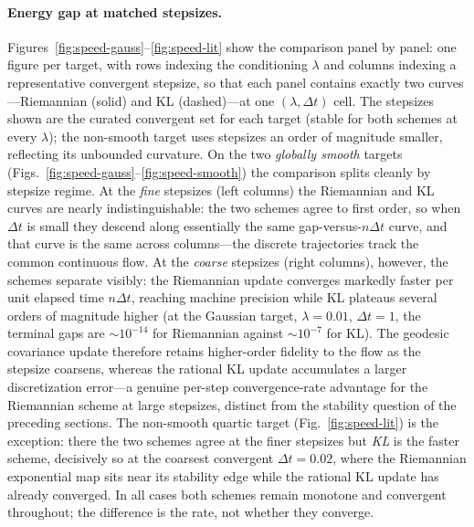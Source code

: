 \documentclass[11pt]{article}
\begin{document}
\begin{table}[t]
\centering
\caption{Head-to-head convergence speed at matched stepsize: terminal energy gap
$\mathcal{E}(a_N)-\mathcal{E}(a_\star)$ (geometric mean over $\lambda\in\{0.01,0.1,1\}$)
for each scheme, the faster scheme, and the factor by which its terminal gap is
smaller. Riemannian wins on both smooth targets, with the margin growing as
$\Delta t$ coarsens; KL wins only on the non-smooth quartic, and only modestly.}
\label{tab:disc-conv}
\end{table}

\paragraph{Energy gap at matched stepsizes.}
Figures~\ref{fig:speed-gauss}--\ref{fig:speed-lit} show the comparison
panel by panel: one figure per target, with rows indexing the conditioning
$\lambda$ and columns indexing a representative convergent stepsize, so that
each panel contains exactly two curves---Riemannian (solid) and KL
(dashed)---at one $(\lambda,\Delta t)$ cell. The stepsizes shown are the curated
convergent set for each target (stable for both schemes at every $\lambda$);
the non-smooth target uses stepsizes an order of magnitude smaller, reflecting its
unbounded curvature. On the two \emph{globally smooth} targets
(Figs.~\ref{fig:speed-gauss}--\ref{fig:speed-smooth}) the comparison splits
cleanly by stepsize regime. At the
\emph{fine} stepsizes (left columns) the Riemannian and KL curves are nearly
indistinguishable: the two schemes agree to first order, so when $\Delta t$ is
small they descend along essentially the same gap-versus-$n\Delta t$ curve, and
that curve is the same across columns---the discrete trajectories track the
common continuous flow. At the \emph{coarse} stepsizes (right columns), however,
the schemes separate visibly: the Riemannian update converges markedly faster
per unit elapsed time $n\Delta t$, reaching machine precision while KL plateaus
several
orders of magnitude higher (at the Gaussian target, $\lambda=0.01$, $\Delta t=1$,
the terminal gaps are $\sim\!10^{-14}$ for Riemannian against $\sim\!10^{-7}$ for
KL). The geodesic covariance update therefore retains higher-order fidelity to
the flow as the stepsize coarsens, whereas the rational KL update accumulates a
larger discretization error---a genuine per-step convergence-rate advantage for
the Riemannian scheme at large stepsizes, distinct from the stability question of
the preceding sections. The non-smooth quartic target
(Fig.~\ref{fig:speed-lit}) is the exception: there the two schemes agree at the
finer stepsizes but \emph{KL} is the faster scheme, decisively so at the coarsest
convergent $\Delta t=0.02$, where the Riemannian exponential map sits near its
stability edge while the rational KL update has already converged. In all cases
both schemes remain monotone and convergent throughout; the
difference is the rate, not whether they converge.
\end{document}
